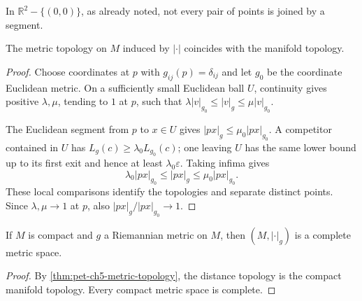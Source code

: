 \begin{example}
  \label{ex:pet-ch5-punctured-plane-no-segment}


  In $\mathbb R^2-\{(0,0)\}$, as already noted, not every pair of points is joined by
  a segment.
\end{example}

\begin{theorem}
  \label{thm:pet-ch5-metric-topology}


  The metric topology on $M$ induced by $|\cdot|$ coincides with the manifold
  topology.
\end{theorem}
\begin{proof}

  \sketch
  Choose coordinates at $p$ with $g_{ij}(p)=\delta_{ij}$ and let $g_0$ be the
  coordinate Euclidean metric.  On a sufficiently small Euclidean ball $U$,
  continuity gives positive $\lambda,\mu$, tending to $1$ at $p$, such that
  $\lambda|v|_{g_0}\le|v|_g\le\mu|v|_{g_0}$.

  The Euclidean segment from $p$ to $x\in U$ gives
  $|px|_g\le\mu_0|px|_{g_0}$.  A competitor contained in $U$ has
  $L_g(c)\ge\lambda_0L_{g_0}(c)$; one leaving $U$ has the same lower bound up to
  its first exit and hence at least $\lambda_0\varepsilon$.  Taking infima gives
  \[
    \lambda_0|px|_{g_0}\le |px|_g\le\mu_0|px|_{g_0}.
  \]
  These local comparisons identify the topologies and separate distinct points.
  Since $\lambda,\mu\to1$ at $p$, also
  $|px|_g/|px|_{g_0}\to1$.
\end{proof}

\begin{corollary}
  \label{cor:pet-ch5-compact-complete-metric}


  If $M$ is compact and $g$ a Riemannian metric on $M$, then $(M,|\cdot|_g)$ is a
  complete metric space.
\end{corollary}
\begin{proof}

  \sketch
  By \cref{thm:pet-ch5-metric-topology}, the distance topology is the compact
  manifold topology.  Every compact metric space is complete.
\end{proof}

